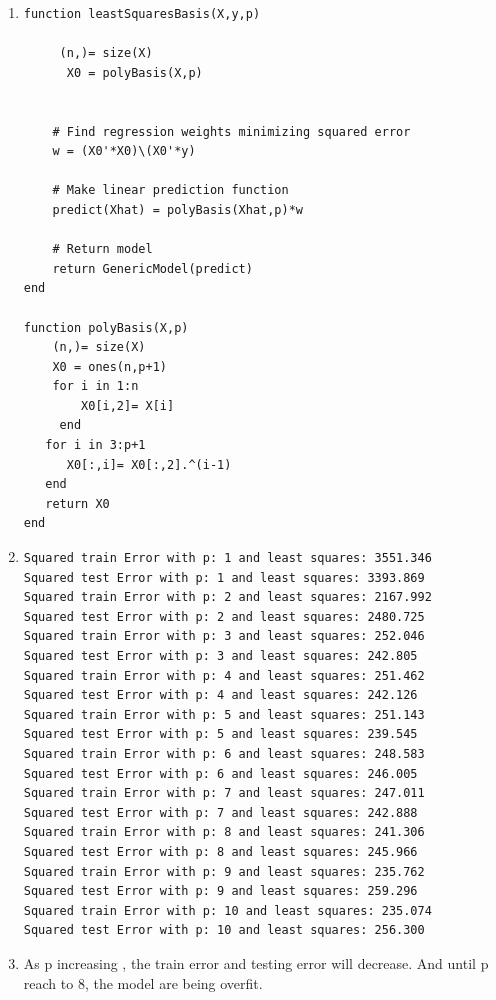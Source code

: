 \documentclass{article}
\begin{document}
\begin{enumerate}
 
\item
\begin{verbatim}
function leastSquaresBasis(X,y,p)

     (n,)= size(X)
      X0 = polyBasis(X,p)


    # Find regression weights minimizing squared error
    w = (X0'*X0)\(X0'*y)

    # Make linear prediction function
    predict(Xhat) = polyBasis(Xhat,p)*w

    # Return model
    return GenericModel(predict)
end

function polyBasis(X,p)
    (n,)= size(X)
    X0 = ones(n,p+1)
    for i in 1:n
        X0[i,2]= X[i]
     end 
   for i in 3:p+1
      X0[:,i]= X0[:,2].^(i-1)
   end
   return X0
end 
 \end{verbatim}


\item
 \begin{verbatim}
Squared train Error with p: 1 and least squares: 3551.346
Squared test Error with p: 1 and least squares: 3393.869
Squared train Error with p: 2 and least squares: 2167.992
Squared test Error with p: 2 and least squares: 2480.725
Squared train Error with p: 3 and least squares: 252.046
Squared test Error with p: 3 and least squares: 242.805
Squared train Error with p: 4 and least squares: 251.462
Squared test Error with p: 4 and least squares: 242.126
Squared train Error with p: 5 and least squares: 251.143
Squared test Error with p: 5 and least squares: 239.545
Squared train Error with p: 6 and least squares: 248.583
Squared test Error with p: 6 and least squares: 246.005
Squared train Error with p: 7 and least squares: 247.011
Squared test Error with p: 7 and least squares: 242.888
Squared train Error with p: 8 and least squares: 241.306
Squared test Error with p: 8 and least squares: 245.966
Squared train Error with p: 9 and least squares: 235.762
Squared test Error with p: 9 and least squares: 259.296
Squared train Error with p: 10 and least squares: 235.074
Squared test Error with p: 10 and least squares: 256.300
 \end{verbatim}

\item As p increasing , the train error and testing error will decrease. And until p reach to 8, the model are being overfit.

\end{enumerate}
\end{document}
